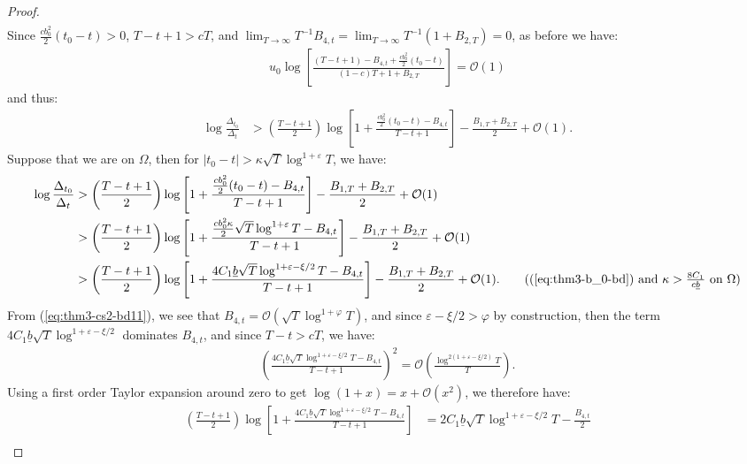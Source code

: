 \begin{proof}
\begin{align*}
\end{align*}
Since $\frac{cb_0^2}{2}(t_0 - t) > 0$, $T-t+1 > cT$, and $\lim_{T\to\infty} T^{-1}B_{4,t} = \lim_{T\to\infty} T^{-1}(1 + B_{2,T}) = 0$, as before we have:
\begin{align*}
    u_0 \log\left[\frac{(T-t +1) - B_{4,t} + \frac{cb_0^2}{2}(t_0 - t)}{(1-c)T + 1 + B_{2,T}}\right] = \mathcal{O}(1)
\end{align*}
and thus:
\begin{align*}
    \log \frac{\Delta_{t_0}}{\Delta_t} &> \left(\frac{T - t +1}{2}\right)\log\left[1  + \frac{\frac{cb_0^2}{2}(t_0 - t)- B_{4,t}}{T-t+1} \right] - \frac{B_{1,T} + B_{2,T}}{2} +  \mathcal{O}(1). 
\end{align*}
Suppose that we are on $\Omega$, then for $|t_0 - t| > \kappa \sqrt{T}\log^{1+\varepsilon} T$, we have:
\begin{align*}
    \log \frac{\Delta_{t_0}}{\Delta_t} &> \left(\frac{T - t +1}{2}\right)\log\left[1  + \frac{\frac{cb_0^2}{2}(t_0 - t)- B_{4,t}}{T-t+1} \right] - \frac{B_{1,T} + B_{2,T}}{2} +  \mathcal{O}(1) \\
    &> \left(\frac{T - t +1}{2}\right)\log\left[1  + \frac{\frac{cb_0^2\kappa}{2}\sqrt{T}\log^{1+\varepsilon} T- B_{4,t}}{T-t+1} \right] - \frac{B_{1,T} + B_{2,T}}{2} +  \mathcal{O}(1) \\
    &> \left(\frac{T - t +1}{2}\right)\log\left[1  + \frac{4C_1\underline{b}\sqrt{T}\log^{1+\varepsilon-\xi/2} T- B_{4,t}}{T-t+1} \right] - \frac{B_{1,T} + B_{2,T}}{2} +  \mathcal{O}(1). \tag{(\ref{eq:thm3-b_0-bd}) and $\kappa > \frac{8C_1}{c\underline{b}}$ on $\Omega$}
\end{align*}
From (\ref{eq:thm3-cs2-bd11}), we see that $B_{4,t} = \mathcal{O}(\sqrt{T}\log^{1+\varphi} T)$, and since $\varepsilon - \xi /2 > \varphi$ by construction, then the term $4C_1\underline{b}\sqrt{T}\log^{1+\varepsilon-\xi/2}$ dominates $B_{4,t}$, and since $T-t > cT$, we have: 
\begin{align*}
    \left(\frac{4C_1\underline{b}\sqrt{T}\log^{1+\varepsilon-\xi/2} T- B_{4,t}}{T-t+1} \right)^2 = \mathcal{O}\left(\frac{\log^{2(1+\varepsilon-\xi/2)}T}{T}\right).
\end{align*}
Using a first order Taylor expansion around zero to get $\log(1 + x) = x + \mathcal{O}(x^2)$, we therefore have:
\begin{align*}
     \left(\frac{T - t +1}{2}\right)\log\left[1  + \frac{4C_1\underline{b}\sqrt{T}\log^{1+\varepsilon-\xi/2} T- B_{4,t}}{T-t+1} \right] &= 2C_1\underline{b}\sqrt{T}\log^{1+\varepsilon-\xi/2} T- \frac{B_{4,t}}{2} \\

\end{align*}
\end{proof}
